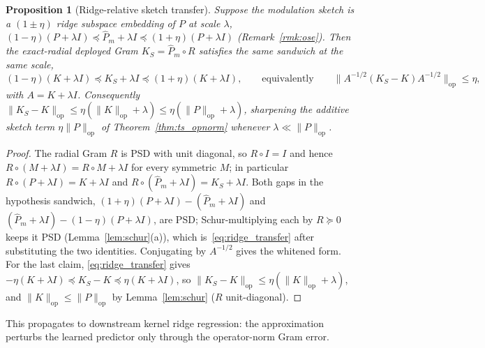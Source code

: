 \documentclass{article}
\newtheorem{proposition}[theorem]{Proposition}
\begin{document}
\begin{proposition}[Ridge-relative sketch transfer]\label{prop:ridge_sketch}
Suppose the modulation sketch is a $(1\pm\eta)$ ridge subspace embedding of $P$ at scale $\lambda$, $(1-\eta)(P+\lambda I)\preceq\widehat P_m+\lambda I\preceq(1+\eta)(P+\lambda I)$ (Remark~\ref{rmk:ose}). Then the exact-radial deployed Gram $K_S=\widehat P_m\circ R$ satisfies the same sandwich at the same scale,
\begin{equation}\label{eq:ridge_transfer}
(1-\eta)(K+\lambda I)\preceq K_S+\lambda I\preceq(1+\eta)(K+\lambda I),
\qquad\text{equivalently}\qquad \bigl\|A^{-1/2}(K_S-K)A^{-1/2}\bigr\|_{\mathrm{op}}\le\eta,
\end{equation}
with $A=K+\lambda I$. Consequently $\|K_S-K\|_{\mathrm{op}}\le\eta(\|K\|_{\mathrm{op}}+\lambda)\le\eta(\|P\|_{\mathrm{op}}+\lambda)$, sharpening the additive sketch term $\eta\|P\|_{\mathrm{op}}$ of Theorem~\ref{thm:ts_opnorm} whenever $\lambda\ll\|P\|_{\mathrm{op}}$.
\end{proposition}
\begin{proof}
The radial Gram $R$ is PSD with unit diagonal, so $R\circ I=I$ and hence $R\circ(M+\lambda I)=R\circ M+\lambda I$ for every symmetric $M$; in particular $R\circ(P+\lambda I)=K+\lambda I$ and $R\circ(\widehat P_m+\lambda I)=K_S+\lambda I$. Both gaps in the hypothesis sandwich, $(1+\eta)(P+\lambda I)-(\widehat P_m+\lambda I)$ and $(\widehat P_m+\lambda I)-(1-\eta)(P+\lambda I)$, are PSD; Schur-multiplying each by $R\succeq0$ keeps it PSD (Lemma~\ref{lem:schur}(a)), which is~\eqref{eq:ridge_transfer} after substituting the two identities. Conjugating by $A^{-1/2}$ gives the whitened form. For the last claim, \eqref{eq:ridge_transfer} gives $-\eta(K+\lambda I)\preceq K_S-K\preceq\eta(K+\lambda I)$, so $\|K_S-K\|_{\mathrm{op}}\le\eta(\|K\|_{\mathrm{op}}+\lambda)$, and $\|K\|_{\mathrm{op}}\le\|P\|_{\mathrm{op}}$ by Lemma~\ref{lem:schur} ($R$ unit-diagonal).
\end{proof}

This propagates to downstream kernel ridge regression: the approximation perturbs the learned predictor only through the operator-norm Gram error.
\end{document}
